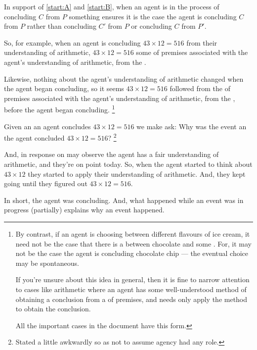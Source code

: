 \begin{note}
  In support of \ref{start:A} and \ref{start:B}, when an agent is in the process of concluding \(C\) from \(P\) something ensures it is the case the agent is concluding \(C\) from \(P\) rather than concluding \(C'\) from \(P\) or concluding \(C\) from \(P'\).

  So, for example, when an agent is concluding \(43 \times 12 = 516\) from their understanding of arithmetic, \(43 \times 12 = 516\) \fof{} some \pool{} of premises associated with the agent's understanding of arithmetic, from the \agpe{}.

  Likewise, nothing about the agent's understanding of arithmetic changed when the agent began concluding, so it seems \(43 \times 12  = 516\) followed from the \pool{} of premises associated with the agent's understanding of arithmetic, from the \agpe{}, before the agent began concluding.%
  \footnote{
    By contrast, if an agent is choosing between different flavours of ice cream, it need not be the case that there is a \fingfr{} between chocolate and some \pool{}.
    For, it may not be the case the agent is concluding chocolate chip --- the eventual choice may be spontaneous.

    If you're unsure about this idea in general, then it is fine to narrow attention to cases like arithmetic where an agent has some well-understood method of obtaining a conclusion from a \pool{} of premises, and needs only apply the method to obtain the conclusion.

    All the important cases in the document have this form.
  }
\end{note}


\begin{note}
  Given an \eiw{} an agent concludes \(43 \times 12 = 516\) we make ask:
  Why was the event an \eiw{} the agent concluded \(43 \times 12 = 516\)?%
  \footnote{
    Stated a little awkwardly so as not to assume agency had any role.
  }

  And, in response on may observe the agent has a fair understanding of arithmetic, and they're on point today.
  So, when the agent started to think about \(43 \times 12\) they started to apply their understanding of arithmetic.
  And, they kept going until they figured out \(43 \times 12 = 516\).

  In short, the agent was concluding.
  And, what happened while an event was in progress (partially) explains why an event happened.
\end{note}



